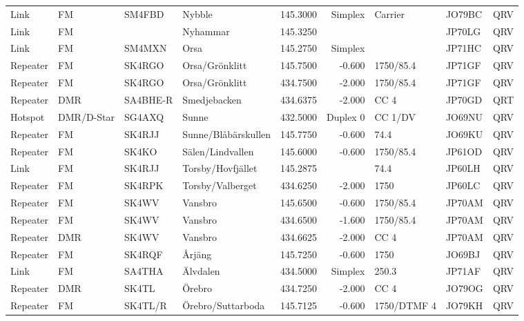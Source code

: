 \begin{landscape}
\begin{longtable}{llllrrlll}
	Link     & FM         & SM4FBD   & Nybble                 &     145.3000 &    Simplex & Carrier          & JO79BC      & QRV      \\
	Link     & FM         &          & Nyhammar               &     145.3250 &            &                  & JP70LG      & QRV      \\
	Link     & FM         & SM4MXN   & Orsa                   &     145.2750 &    Simplex &                  & JP71HC      & QRV      \\
	Repeater & FM         & SK4RGO   & Orsa/Grönklitt         &     145.7500 &     -0.600 & 1750/85.4        & JP71GF      & QRV      \\
	Repeater & FM         & SK4RGO   & Orsa/Grönklitt         &     434.7500 &     -2.000 & 1750/85.4        & JP71GF      & QRV      \\
	Repeater & DMR        & SA4BHE-R & Smedjebacken           &     434.6375 &     -2.000 & CC 4             & JP70GD      & QRT      \\
	Hotspot  & DMR/D-Star & SG4AXQ   & Sunne                  &     432.5000 &   Duplex 0 & CC 1/DV          & JO69NU      & QRV      \\
	Repeater & FM         & SK4RJJ   & Sunne/Blåbärskullen    &     145.7750 &     -0.600 & 74.4             & JO69KU      & QRV      \\
	Repeater & FM         & SK4KO    & Sälen/Lindvallen       &     145.6000 &     -0.600 & 1750/85.4        & JP61OD      & QRV      \\
	Link     & FM         & SK4RJJ   & Torsby/Hovfjället      &     145.2875 &            & 74.4             & JP60LH      & QRV      \\
	Repeater & FM         & SK4RPK   & Torsby/Valberget       &     434.6250 &     -2.000 & 1750             & JP60LC      & QRV      \\
	Repeater & FM         & SK4WV    & Vansbro                &     145.6500 &     -0.600 & 1750/85.4        & JP70AM      & QRV      \\
	Repeater & FM         & SK4WV    & Vansbro                &     434.6500 &     -1.600 & 1750/85.4        & JP70AM      & QRV      \\
	Repeater & DMR        & SK4WV    & Vansbro                &     434.6625 &     -2.000 & CC 4             & JP70AM      & QRV      \\
	Repeater & FM         & SK4RQF   & Årjäng                 &     145.7250 &     -0.600 & 1750             & JO69BJ      & QRV      \\
	Link     & FM         & SA4THA   & Älvdalen               &     434.5000 &    Simplex & 250.3            & JP71AF      & QRV      \\
	Repeater & DMR        & SK4TL    & Örebro                 &     434.7250 &     -2.000 & CC 4             & JO79OG      & QRV      \\
	Repeater & FM         & SK4TL/R  & Örebro/Suttarboda      &     145.7125 &     -0.600 & 1750/DTMF 4      & JO79KH      & QRV     
\end{longtable}



\end{landscape}
